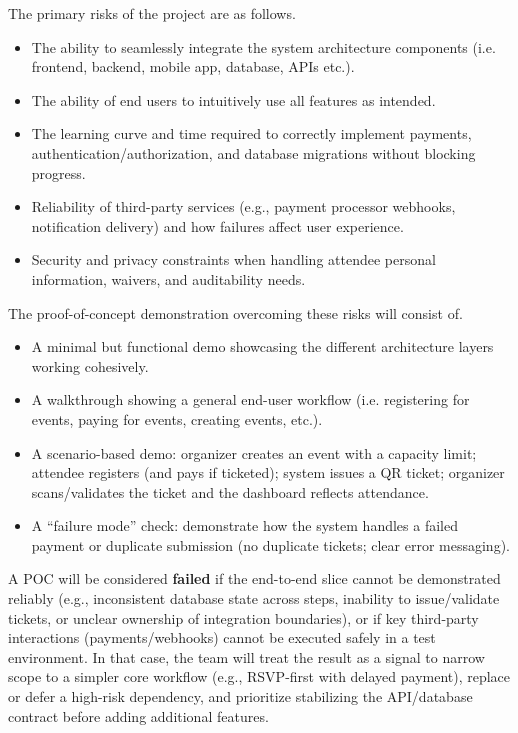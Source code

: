 \documentclass{article}
\begin{document}
The primary risks of the project are as follows.
\begin{itemize}
    \item The ability to seamlessly integrate the system architecture components (i.e. frontend, backend, mobile app, database, APIs etc.).
    \item The ability of end users to intuitively use all features as intended.
    \item The learning curve and time required to correctly implement payments, authentication/authorization, and database migrations without blocking progress.
    \item Reliability of third-party services (e.g., payment processor webhooks, notification delivery) and how failures affect user experience.
    \item Security and privacy constraints when handling attendee personal information, waivers, and auditability needs.
\end{itemize}

\noindent The proof-of-concept demonstration overcoming these risks will consist of.

\begin{itemize}
    \item A minimal but functional demo showcasing the different architecture layers working cohesively.
    \item A walkthrough showing a general end-user workflow (i.e. registering for events, paying for events, creating events, etc.).
    \item A scenario-based demo: organizer creates an event with a capacity limit; attendee registers (and pays if ticketed); system issues a QR ticket; organizer scans/validates the ticket and the dashboard reflects attendance.
    \item A ``failure mode'' check: demonstrate how the system handles a failed payment or duplicate submission (no duplicate tickets; clear error messaging).
\end{itemize}

\noindent A POC will be considered \textbf{failed} if the end-to-end slice cannot be demonstrated reliably (e.g., inconsistent database state across steps, inability to issue/validate tickets, or unclear ownership of integration boundaries), or if key third-party interactions (payments/webhooks) cannot be executed safely in a test environment. In that case, the team will treat the result as a signal to narrow scope to a simpler core workflow (e.g., RSVP-first with delayed payment), replace or defer a high-risk dependency, and prioritize stabilizing the API/database contract before adding additional features.
\end{document}
